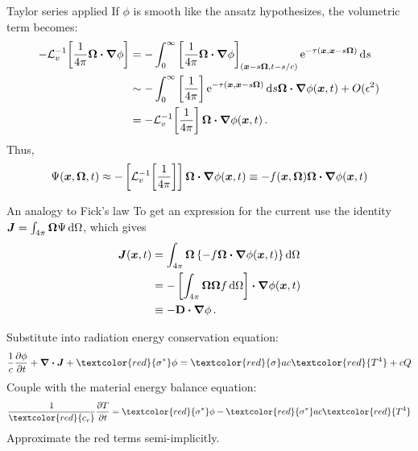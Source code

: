 \documentclass{beamer}
\begin{document}
\begin{frame}{Taylor series applied}
  If $\phi$ is smooth like the ansatz hypothesizes, the volumetric term becomes:
  \begin{align} \nonumber
  -\mathcal{L}_{v}^{-1}\!\left[ \frac{1}{4\pi} \bm{\Omega}\bm{\cdot} \bm{\nabla} \phi \right]
  &= -\int_{0}^{\infty}
    \left[ \frac{1}{4\pi} \bm{\Omega}\bm{\cdot} \bm{\nabla} \phi \right]_{(\bm{x} - s
    \bm{\Omega}, t-s/c)}
    \mathop{}\!\mathrm{e}^{ -\tau(\bm{x}, \bm{x} - s \bm{\Omega})}
    \mathop{}\!\mathrm{d} s
  \\\nonumber
  &\sim - \int_{0}^{\infty}
    \left[ \frac1{4\pi}\right]
    \mathop{}\!\mathrm{e}^{ -\tau(\bm{x}, \bm{x} - s \bm{\Omega})} \mathop{}\!\mathrm{d} s
    \bm{\Omega}\bm{\cdot} \bm{\nabla} \phi(\bm{x},t) + O(\epsilon^2)
  \\\label{eq:tildeS}
  &= - \mathcal{L}_{v}^{-1}\!\left[ \frac1{4\pi} \right] \bm{\Omega}\bm{\cdot} \bm{\nabla} \phi(\bm{x},t)\,.
  \end{align}
  Thus,
  \begin{equation}\label{eq:capPsiApprox}
    \Psi(\bm{x}, \bm{\Omega}, t) \approx
    - \left[ \mathcal{L}_{v}^{-1}\!\left[ \frac1{4\pi} \right] \right]
    \bm{\Omega}\bm{\cdot} \bm{\nabla} \phi(\bm{x},t)
    \equiv -f(\bm{x}, \bm{\Omega}) \bm{\Omega}\bm{\cdot} \bm{\nabla} \phi(\bm{x},t)
  \end{equation}
\end{frame}

\begin{frame}{An analogy to Fick's law}
  To get an expression for the current use the
  identity
  $\bm{J} = \int_{4\pi}\bm{\Omega} \Psi \mathop{}\!\mathrm{d}\Omega$, which gives
  \begin{align*}
    \bm{J}(\bm{x}, t)
    &= \int_{4\pi}\bm{\Omega} \left\{
    -f \bm{\Omega}\bm{\cdot} \bm{\nabla} \phi(\bm{x},t) \right\} \mathop{}\!\mathrm{d}\Omega
    \\
    &= - \left[ \int_{4\pi}\bm{\Omega} \bm{\Omega} f \mathop{}\!\mathrm{d}\Omega\right]
    \bm{\cdot} \bm{\nabla} \phi(\bm{x},t) 
    \\
      &\equiv -\mathbf{D} \bm{\cdot} \bm{\nabla} \phi \,.
  \end{align*}

  Substitute into radiation energy conservation equation:
\begin{equation*}
  \frac{1}{c} \pder{\phi}{t}
  + \del \vd \vec{J} + \textcolor{red}{\sigma^*} \phi
  = \textcolor{red}{\sigma} ac\textcolor{red}{T^4}
  + c Q
\end{equation*}
Couple with the material energy balance equation:
\begin{equation*}
  \frac{1}{\textcolor{red}{c_v}}\pder{T}{t} = \textcolor{red}{\sigma^*} \phi -
  \textcolor{red}{\sigma^*} ac\textcolor{red}{T^4}
\end{equation*}
Approximate the red terms semi-implicitly.
\end{frame}
\end{document}
